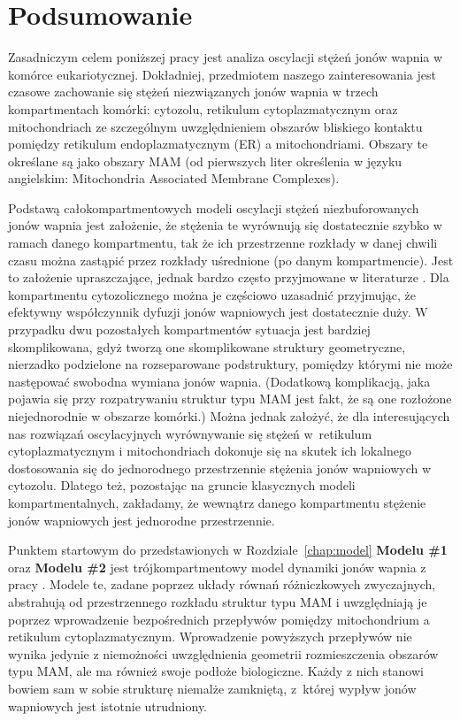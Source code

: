 \chapter{Podsumowanie}
\label{chap:podsumowanie}

Zasadniczym celem poniższej pracy jest analiza oscylacji stężeń jonów wapnia w komórce eukariotycznej. Dokładniej, przedmiotem naszego zainteresowania jest  czasowe zachowanie się stężeń niezwiązanych jonów wapnia w trzech kompartmentach komórki: cytozolu, retikulum cytoplazmatycznym oraz mitochondriach ze szczególnym uwzględnieniem obszarów bliskiego kontaktu pomiędzy retikulum endoplazmatycznym (ER) a mitochondriami. Obszary te określane są jako obszary MAM (od pierwszych liter określenia w języku angielskim: Mitochondria Associated Membrane Complexes).


Podstawą całokompartmentowych modeli oscylacji stężeń niezbuforowanych jonów wapnia jest założenie, że stężenia te wyrównują się dostatecznie szybko w ramach danego kompartmentu, tak że ich przestrzenne rozkłady w danej chwili czasu można zastąpić przez rozkłady uśrednione (po danym kompartmencie). Jest to założenie upraszczające, jednak bardzo często przyjmowane w literaturze  \cite{Atri1993,Borghans1997,Goldbeter1990,Marhl2000,Sneyd1995}. 
Dla kompartmentu cytozolicznego można je częściowo uzasadnić przyjmując, że efektywny współczynnik dyfuzji jonów wapniowych jest dostatecznie duży. W przypadku dwu pozostałych kompartmentów sytuacja jest bardziej skomplikowana, gdyż tworzą one skomplikowane struktury geometryczne, nierzadko podzielone na rozseparowane podstruktury, pomiędzy którymi nie może następować swobodna wymiana jonów wapnia. (Dodatkową komplikacją, jaka pojawia się przy rozpatrywaniu struktur typu MAM jest fakt, że są one rozłożone niejednorodnie w obszarze komórki.) Można jednak założyć, że dla interesujących nas rozwiązań oscylacyjnych  wyrównywanie się stężeń w~retikulum cytoplazmatycznym i mitochondriach dokonuje się na skutek ich lokalnego dostosowania się do jednorodnego przestrzennie stężenia jonów wapniowych w cytozolu. Dlatego też, pozostając na gruncie klasycznych modeli kompartmentalnych, zakładamy, że wewnątrz danego kompartmentu stężenie jonów wapniowych jest jednorodne przestrzennie. 

Punktem startowym do przedstawionych w Rozdziale~\ref{chap:model} \textbf{Modelu \#1} oraz \textbf{Modelu \#2} jest trójkompartmentowy model dynamiki jonów wapnia z pracy \cite{Marhl2000}. Modele te, zadane poprzez układy równań różniczkowych zwyczajnych, abstrahują od przestrzennego rozkładu struktur typu MAM i uwzględniają je poprzez wprowadzenie bezpośrednich przepływów pomiędzy mitochondrium a retikulum cytoplazmatycznym. Wprowadzenie powyższych przepływów nie wynika jedynie z niemożności uwzględnienia geometrii rozmieszczenia obszarów typu MAM, ale ma również swoje podłoże biologiczne. Każdy z nich stanowi bowiem sam w sobie strukturę niemalże zamkniętą, z~której wypływ jonów wapniowych jest istotnie utrudniony.



